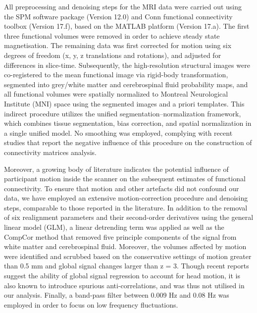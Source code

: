 All preprocessing and denoising steps for the MRI data were carried out using the SPM software package (Version 12.0) and Conn functional connectivity toolbox (Version 17.f), based on the MATLAB platform (Version 17.a). The first three functional volumes were removed in order to achieve steady state magnetisation. The remaining data was first corrected for motion using six degrees of freedom (x, y, z translations and rotations), and adjusted for differences in slice-time. Subsequently, the high-resolution structural images were co-registered to the mean functional image via rigid-body transformation, segmented into grey/white matter and cerebrospinal fluid probability maps, and all functional volumes were spatially normalized to Montreal Neurological Institute (MNI) space using the segmented images and a priori templates. This indirect procedure utilizes the unified segmentation–normalization framework, which combines tissue segmentation, bias correction, and spatial normalization in a single unified model. No smoothing was employed, complying with recent studies that report the negative influence of this procedure on the construction of connectivity matrices analysis.

Moreover, a growing body of literature indicates the potential influence of participant motion inside the scanner on the subsequent estimates of functional connectivity. To ensure that motion and other artefacts did not confound our data, we have employed an extensive motion-correction procedure and denoising steps, comparable to those reported in the literature. In addition to the removal of six realignment parameters and their second-order derivatives using the general linear model (GLM), a linear detrending term was applied as well as the CompCor method that removed five principle components of the signal from white matter and cerebrospinal fluid. Moreover, the volumes affected by motion were identified and scrubbed based on the conservative settings of motion greater than 0.5 mm and global signal changes larger than z = 3. Though recent reports suggest the ability of global signal regression to account for head motion, it is also known to introduce spurious anti-correlations, and was thus not utilised in our analysis. Finally, a band-pass filter between 0.009 Hz and 0.08 Hz was employed in order to focus on low frequency fluctuations.

